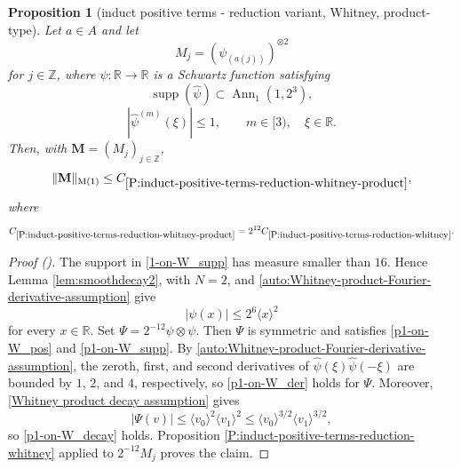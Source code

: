 \documentclass[12pt,reqno]{amsart}
\newcommand{\auto}{{({\tiny\faCar})}}
\theoremstyle{plain}
\newtheorem{proposition}[theorem]{Proposition}
\numberwithin{equation}{section}
\theoremstyle{remark}
\newcommand{\uses}[1]{}
\newcommand{\usesdefs}[1]{}
\newcommand{\Z}{{\mathbb Z}}
\newcommand{\R}{{\mathbb R}}
\newcommand{\M}{\mathbf{M}}
\begin{document}
\begin{proposition}[induct positive terms - reduction variant, Whitney, product-type]
\label{P:induct-positive-terms-reduction-whitney-product}\uses{P:induct-positive-terms-reduction-whitney,lem:smoothdecay2}\usesdefs{bracket bump,multiplicatively spaced monotone sequences,kernel sequences}
Let $a\in A$ and let
\begin{equation}\label{auto:Whitney-product-kernel}
M_j=(\psi_{(a(j))})^{\otimes2}
\end{equation}
for $j\in\Z$, where $\psi:\R\to\R$ is a Schwartz function satisfying
\begin{equation}\label{1-on-W_supp}
\operatorname{supp}(\widehat\psi)\subset\operatorname{Ann}_1(1,2^3),
\end{equation}
\begin{equation}\label{auto:Whitney-product-Fourier-derivative-assumption}
|\widehat\psi^{(m)}(\xi)|\le1,
\qquad
m\in[3),
\quad
\xi\in\R.
\end{equation}
Then, with $\M=(M_j)_{j\in\Z}$,
\begin{equation}\label{auto:Whitney-product-reduction-bound}
\|\M\|_{{\rm M}(1)}\le C_{\ref{P:induct-positive-terms-reduction-whitney-product}},
\end{equation}
where
\begin{equation}\label{auto:Whitney-product-constant-definition}
C_{\ref{P:induct-positive-terms-reduction-whitney-product}}
=2^{12}C_{\ref{P:induct-positive-terms-reduction-whitney}}.
\end{equation}
\end{proposition}

\begin{proof}[Proof \auto]
The support in \eqref{1-on-W_supp} has measure smaller than $16$. Hence Lemma \ref{lem:smoothdecay2}, with $N=2$, and \eqref{auto:Whitney-product-Fourier-derivative-assumption} give
\begin{equation}\label{Whitney product decay assumption}
|\psi(x)|\le2^6\langle x\rangle^2
\end{equation}
for every $x\in\R$.
Set $\Psi=2^{-12}\psi\otimes\psi$. Then $\Psi$ is symmetric and satisfies \eqref{p1-on-W_pos} and \eqref{p1-on-W_supp}. By \eqref{auto:Whitney-product-Fourier-derivative-assumption}, the zeroth, first, and second derivatives of $\widehat\psi(\xi)\widehat\psi(-\xi)$ are bounded by $1$, $2$, and $4$, respectively, so \eqref{p1-on-W_der} holds for $\Psi$. Moreover, \eqref{Whitney product decay assumption} gives
\[
|\Psi(v)|
\le\langle v_0\rangle^2\langle v_1\rangle^2
\le\langle v_0\rangle^{3/2}\langle v_1\rangle^{3/2},
\]
so \eqref{p1-on-W_decay} holds. Proposition \ref{P:induct-positive-terms-reduction-whitney} applied to $2^{-12}M_j$ proves the claim.
\end{proof}
\end{document}
